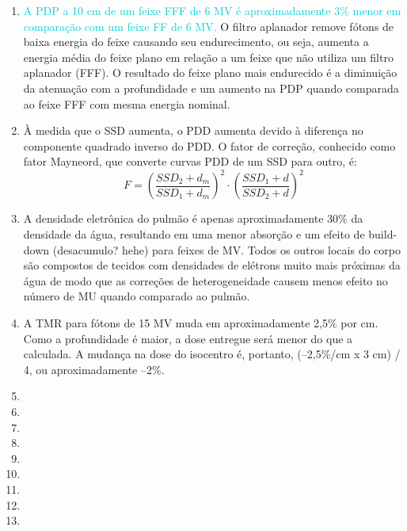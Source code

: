 \documentclass[11pt,a4paper]{article}
\begin{document}
\begin{enumerate}
        \item \textcolor{DarkTurquoise}{A PDP a 10 cm de um feixe FFF de 6 MV é aproximadamente 3\% menor em comparação com um feixe FF de 6 MV.} O filtro aplanador remove fótons de baixa energia do feixe causando seu endurecimento, ou seja, aumenta a energia média do feixe plano em relação a um feixe que não utiliza um filtro aplanador (FFF). O resultado do feixe plano mais endurecido é a diminuição da atenuação com a profundidade e um aumento na PDP quando comparada ao feixe FFF com mesma energia nominal.

        \item À medida que o SSD aumenta, o PDD aumenta devido à diferença no componente quadrado inverso do PDD. O fator de correção, conhecido como fator Mayneord, que converte curvas PDD de um SSD para outro, é: $$F = \left(\frac{SSD_2 + d_m}{SSD_1 + d_m}\right)^2 \cdot \left(\frac{SSD_1 + d}{SSD_2 + d}\right)^2$$ 

        \item A densidade eletrônica do pulmão é apenas aproximadamente 30\% da densidade da água, resultando em uma menor absorção e um efeito de build-down (desacumulo? hehe) para feixes de MV. Todos os outros locais do corpo são compostos de tecidos com densidades de elétrons muito mais próximas da água de modo que as correções de heterogeneidade causem menos efeito no número de MU quando comparado ao pulmão.

        \item A TMR para fótons de 15 MV muda em aproximadamente 2,5\% por cm. Como a profundidade é maior, a dose entregue será menor do que a calculada. A mudança na dose do isocentro é, portanto, (–2,5\%/cm x 3 cm) / 4, ou aproximadamente –2\%.

        \item 

        \item 

        \item 

        \item 

        \item 

        \item 

        \item 

        \item 

        \item 



    \end{enumerate}
\end{document}
